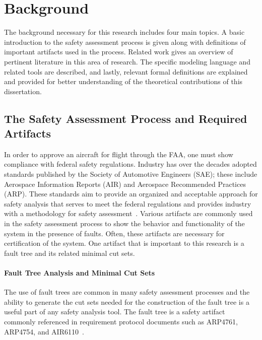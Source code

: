 \chapter{Background}
\label{chap:background}
The background necessary for this research includes four main topics. A basic introduction to the safety assessment process is given along with definitions of important artifacts used in the process. Related work gives an overview of pertinent literature in this area of research. The specific modeling language and related tools are described, and lastly, relevant formal definitions are explained and provided for better understanding of the theoretical contributions of this dissertation.

\section{The Safety Assessment Process and Required Artifacts}
In order to approve an aircraft for flight through the FAA, one must show compliance with federal safety regulations. Industry has over the decades adopted standards published by the Society of Automotive Engineers (SAE); these include Aerospace Information Reports (AIR) and Aerospace Recommended Practices (ARP). These standards aim to provide an organized and acceptable approach for safety analysis that serves to meet the federal regulations and provides industry with a methodology for safety assessment~\cite{FAA,SAE}. Various artifacts are commonly used in the safety assessment process to show the behavior and functionality of the system in the presence of faults. Often, these artifacts are necessary for certification of the system. One artifact that is important to this research is a fault tree and its related minimal cut sets.

\subsubsection{Fault Tree Analysis and Minimal Cut Sets}
The use of fault trees are common in many safety assessment processes and the ability to generate the cut sets needed for the construction of the fault tree is a useful part of any safety analysis tool. The fault tree is a safety artifact commonly referenced in requirement protocol documents such as ARP4761, ARP4754, and AIR6110~\cite{SAE:ARP4761,SAE:ARP4754A,AIR6110}.


